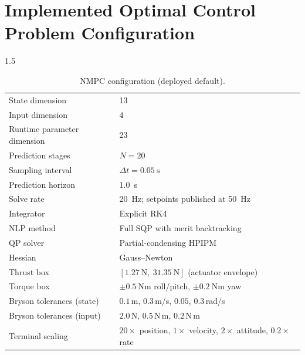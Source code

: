 \begin{appendices}
\label{cha:appendices}

\chapter{Implemented Optimal Control Problem Configuration}

\begin{spacing}{1.5}

\begin{table}[ht]
\centering
\caption{NMPC configuration (deployed default).}
\begin{tabular}{@{}ll@{}}
\toprule
State dimension & 13 \\
Input dimension & 4 \\
Runtime parameter dimension & 23 \\
Prediction stages & $N=20$ \\
Sampling interval & $\Delta t=\SI{0.05}{\second}$ \\
Prediction horizon & \SI{1.0}{\second} \\
Solve rate & \SI{20}{\hertz}; setpoints published at \SI{50}{\hertz} \\
Integrator & Explicit RK4 \\
NLP method & Full SQP with merit backtracking \\
QP solver & Partial-condensing HPIPM \\
Hessian & Gauss--Newton \\
Thrust box & $[\SI{1.27}{\newton},\ \SI{31.35}{\newton}]$ (actuator envelope) \\
Torque box & $\pm\SI{0.5}{\newton\meter}$ roll/pitch, $\pm\SI{0.2}{\newton\meter}$ yaw \\
Bryson tolerances (state) & $0.1$\,m, $0.3$\,m/s, $0.05$, $0.3$\,rad/s \\
Bryson tolerances (input) & $2.0$\,N, $0.5$\,N\,m, $0.2$\,N\,m \\
Terminal scaling & $20\times$ position, $1\times$ velocity, $2\times$ attitude, $0.2\times$ rate \\
\bottomrule
\end{tabular}
\end{table}


\end{spacing}
\end{appendices}
